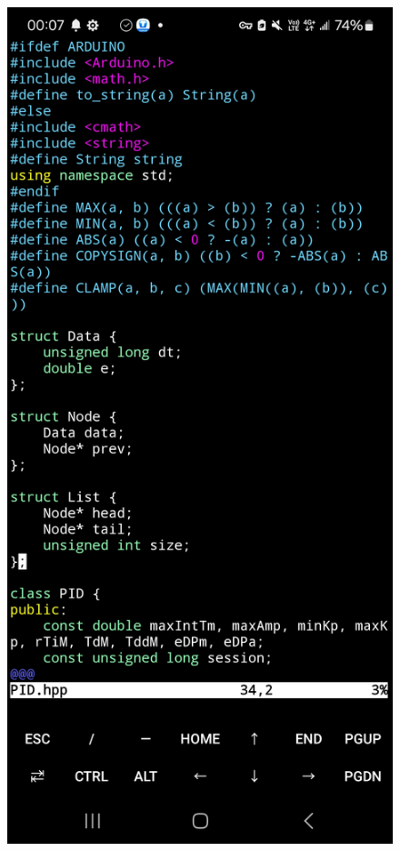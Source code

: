 \documentclass[a4paper,12pt]{./article}
\begin{document}
\begin{center}\begin{figure}[H]\centering
\hfill
\begin{minipage}[t]{./0.45\textwidth}
\centering
\includegraphics[width=\textwidth]{./working_screenshots/5.jpg}

\end{minipage}
\end{figure}
\end{center}
\end{document}
